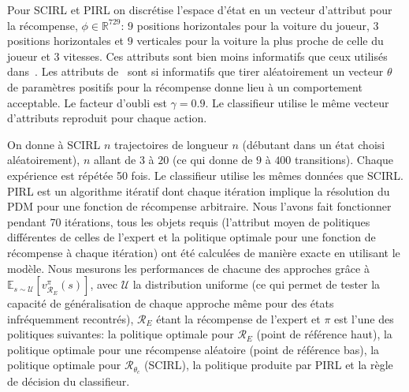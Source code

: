 \documentclass[french,utf8]{./hermes-journal}
\newcommand{\R}{\mathcal{R}}
\newcommand{\E}{\mathbb{E}}
\begin{document}
Pour SCIRL et PIRL on discrétise l'espace d'état en un vecteur d'attribut pour la récompense, $\phi\in\mathbb{R}^{729}$: $9$ positions horizontales pour la voiture du joueur, $3$ positions horizontales et $9$ verticales pour la voiture la plus proche de celle du joueur et $3$ vitesses. Ces attributs sont bien moins informatifs que ceux utilisés dans~\cite{Abbee004,Sye00ame}. Les attributs de~\cite{Sye00ame} sont si informatifs que tirer aléatoirement un vecteur $\theta$ de paramètres positifs pour la récompense donne lieu à un comportement acceptable. Le facteur d'oubli est $\gamma = 0.9$. Le classifieur utilise le même vecteur d'attributs reproduit pour chaque action.

On donne à SCIRL $n$ trajectoires de longueur $n$ (débutant dans un état choisi aléatoirement), $n$ allant de  $3$ à $20$ (ce qui donne de $9$ à
$400$ transitions). Chaque expérience est répétée 50 fois. Le classifieur utilise les mêmes données que SCIRL. PIRL est un algorithme itératif dont chaque itération implique la résolution du PDM pour une fonction de récompense arbitraire. Nous l'avons fait fonctionner pendant 70 itérations, tous les objets requis (l'attribut moyen de politiques différentes de celles de l'expert et la politique optimale pour une fonction de récompense à chaque itération) ont été calculées de manière exacte en utilisant le modèle. Nous mesurons les performances de chacune des approches grâce à $\E_{s\sim \mathcal{U}}[v^\pi_{\R_E}(s)]$, avec $\mathcal{U}$
la distribution uniforme (ce qui permet de tester la capacité de généralisation de chaque approche même pour des états infréquemment recontrés), $\R_E$ étant la récompense de l'expert et $\pi$ est l'une des politiques suivantes: la politique optimale pour $\R_E$ (point de référence haut),
la politique optimale pour une récompense aléatoire (point de référence bas), la politique optimale pour $\R_{\theta_c}$ (SCIRL), la politique produite par PIRL et la règle de décision du classifieur.
\end{document}
